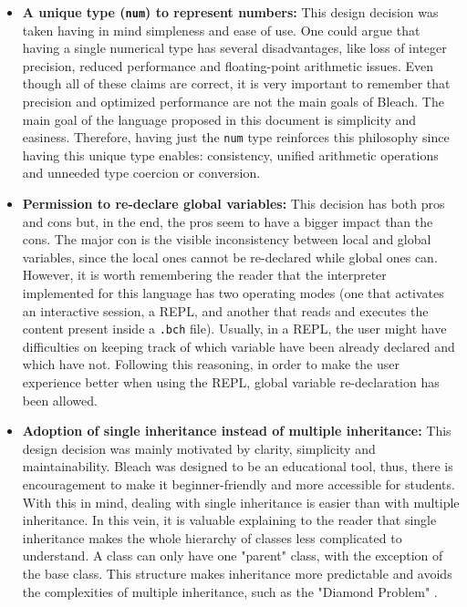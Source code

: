 \begin{itemize}
\begin{itemize}
        \item \textbf{A unique type (\texttt{num}) to represent numbers:} This design decision was taken having in mind simpleness and ease of use. One could argue that having a single numerical type has several disadvantages, like loss of integer precision, reduced performance and floating-point arithmetic issues. Even though all of these claims are correct, it is very important to remember that precision and optimized performance are not the main goals of Bleach. The main goal of the language proposed in this document is simplicity and easiness. Therefore, having just the \texttt{num} type reinforces this philosophy since having this unique type enables: consistency, unified arithmetic operations and unneeded type coercion or conversion.
        
        \item \textbf{Permission to re-declare global variables:} This decision has both pros and cons but, in the end, the pros seem to have a bigger impact than the cons. The major con is the visible inconsistency between local and global variables, since the local ones cannot be re-declared while global ones can. However, it is worth remembering the reader that the interpreter implemented for this language has two operating modes (one that activates an interactive session, a REPL, and another that reads and executes the content present inside a \texttt{.bch} file). Usually, in a REPL, the user might have difficulties on keeping track of which variable have been already declared and which have not. Following this reasoning, in order to make the user experience better when using the REPL, global variable re-declaration has been allowed.
        
        \item \textbf{Adoption of single inheritance instead of multiple inheritance:} This design decision was mainly motivated by clarity, simplicity and maintainability. Bleach was designed to be an educational tool, thus, there is encouragement to make it beginner-friendly and more accessible for students. With this in mind, dealing with single inheritance is easier than with multiple inheritance. In this vein, it is valuable explaining to the reader that single inheritance makes the whole hierarchy of classes less complicated to understand. A class can only have one "parent" class, with the exception of the base class. This structure makes inheritance more predictable and avoids the complexities of multiple inheritance, such as the "Diamond Problem" \cite{wikipedia_the_diamond_problem}.
    \end{itemize}



\end{itemize}
